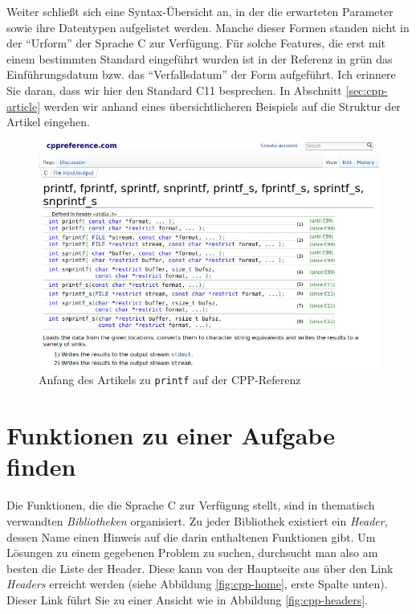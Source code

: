 Weiter schließt sich eine Syntax-Übersicht an, in der die erwarteten Parameter sowie ihre Datentypen aufgelistet werden. Manche dieser Formen standen nicht in der \enquote{Urform} der Sprache C zur Verfügung. Für solche Features, die erst mit einem bestimmten Standard eingeführt wurden ist in der Referenz in grün das Einführungsdatum bzw. das \enquote{Verfallsdatum} der Form aufgeführt. Ich erinnere Sie daran, dass wir hier den Standard C11 besprechen. In Abschnitt \ref{sec:cpp-article} werden wir anhand eines übersichtlicheren Beispiels auf die Struktur der Artikel eingehen.

\begin{figure}[h!]
	\includegraphics[width=\linewidth]{./gfx/cpp-printf}
	\caption{Anfang des Artikels zu \texttt{printf} auf der CPP-Referenz} \label{fig:cpp-printf}
\end{figure}

\section{Funktionen zu einer Aufgabe finden}
Die Funktionen, die die Sprache C zur Verfügung stellt, sind in thematisch verwandten \emph{Bibliotheken} organisiert. Zu jeder Bibliothek existiert ein \emph{Header}, dessen Name einen Hinweis auf die darin enthaltenen Funktionen gibt. Um Lösungen zu einem gegebenen Problem zu suchen, durchsucht man also am besten die Liste der Header. Diese kann von der Hauptseite aus über den Link \emph{Headers} erreicht werden (siehe Abbildung \ref{fig:cpp-home}, erste Spalte unten). Dieser Link führt Sie zu einer Ansicht wie in Abbildung \ref{fig:cpp-headers}.


